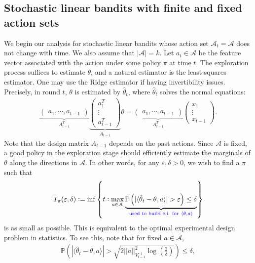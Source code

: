 \documentclass[10pt,a4article]{amsart}
\numberwithin{equation}{section}
\theoremstyle{plain}
\theoremstyle{definition}
\def\P{{\mathbb P}}
\def\e{{\varepsilon}}
\def\t{{\theta}}
\begin{document}
\subsection{Stochastic linear bandits with finite and fixed action sets}

We begin our analysis for stochastic linear bandits whose action set $\mathcal A_t = \mathcal A$ does not change with time. We also assume that $|\mathcal A|=k$. Let $a_t\in\mathcal A$ be the feature vector associated with the action under some policy $\pi$ at time $t$. The exploration process suffices to estimate $\t$, and a natural estimator is the least-squares estimator. One may use the Ridge estimator if having invertibility issues. Precisely, in round $t$, $\t$ is estimated by $\hat{\t}_t$, where $\hat{\t}_t $ solves the normal equations: 
\begin{align*}
\underbrace{\begin{pmatrix}
a_1, \cdots, a_{t-1}
\end{pmatrix}}_{A^T_{t-1}}\underbrace{\begin{pmatrix}
a_1^T \\
\vdots \\
a_{t-1}^T
\end{pmatrix}}_{A_{t-1}}\t = \underbrace{\begin{pmatrix}
a_1, \cdots, a_{t-1}
\end{pmatrix}}_{A^T_{t-1}}\begin{pmatrix}
x_1 \\
\vdots \\
x_{t-1}
\end{pmatrix}.
\end{align*}
Note that the design matrix $A_{t-1}$ depends on the past actions. Since $\mathcal A$ is fixed, a good policy in the exploration stage should efficiently estimate the marginals of $\t$ along the directions in $\mathcal A$. In other words, for any $\e, \delta>0$, we wish to find a $\pi$ such that 
\begin{align}
T_{\pi}(\e, \delta):=\inf\left\{t: \max_{a\in\mathcal A}\underbrace{\P\left(|\langle\hat{\t}_t-\t, a\rangle|>\e\right)\leq\delta}_{\textcolor{blue}{\text{used to build c.i. for}\ \langle\t, a\rangle}}\right\}\label{sl:5}
\end{align}
is as small as possible. This is equivalent to the optimal experimental design problem in statistics. 
To see this, note that for fixed $a\in\mathcal A$, 
\begin{align*}
\P\left(|\langle\hat{\t}_t-\t, a\rangle|>\sqrt{2||a||^2_{V_{t-1}^{-1}}\log\left(\frac{2}{\delta}\right)}\right)\leq\delta,
\end{align*}
\end{document}
